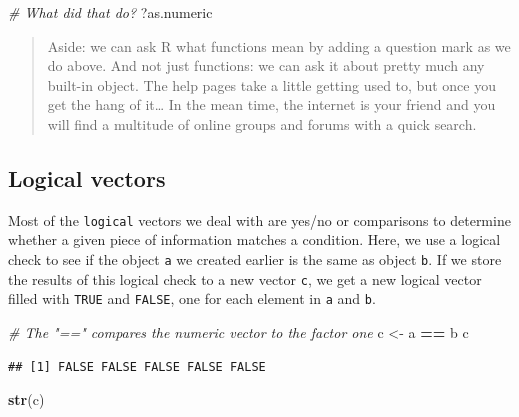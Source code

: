 \documentclass[
]{book}
\newenvironment{Shaded}{\begin{snugshade}}{\end{snugshade}}
\newcommand{\CommentTok}[1]{\textcolor[rgb]{0.56,0.35,0.01}{\textit{#1}}}
\newcommand{\KeywordTok}[1]{\textcolor[rgb]{0.13,0.29,0.53}{\textbf{#1}}}
\newcommand{\NormalTok}[1]{#1}
\newcommand{\OperatorTok}[1]{\textcolor[rgb]{0.81,0.36,0.00}{\textbf{#1}}}
\newcommand{\StringTok}[1]{\textcolor[rgb]{0.31,0.60,0.02}{#1}}
\begin{document}
\begin{Shaded}
\begin{Highlighting}[]
\CommentTok{# What did that do?}
\NormalTok{?as.numeric}
\end{Highlighting}
\end{Shaded}

\begin{quote}
Aside: we can ask R what functions mean by adding a question mark as we do above. And not just functions: we can ask it about pretty much any built-in object. The help pages take a little getting used to, but once you get the hang of it\ldots{} In the mean time, the internet is your friend and you will find a multitude of online groups and forums with a quick search.
\end{quote}

\hypertarget{logicals}{%
\subsection*{Logical vectors}\label{logicals}}

Most of the \texttt{logical} vectors we deal with are yes/no or comparisons to determine whether a given piece of information matches a condition. Here, we use a logical check to see if the object \texttt{a} we created earlier is the same as object \texttt{b}. If we store the results of this logical check to a new vector \texttt{c}, we get a new logical vector filled with \texttt{TRUE} and \texttt{FALSE}, one for each element in \texttt{a} and \texttt{b}.

\begin{Shaded}
\begin{Highlighting}[]
\CommentTok{# The "==" compares the numeric vector to the factor one}
\NormalTok{c <-}\StringTok{ }\NormalTok{a }\OperatorTok{==}\StringTok{ }\NormalTok{b}
\NormalTok{c}
\end{Highlighting}
\end{Shaded}

\begin{verbatim}
## [1] FALSE FALSE FALSE FALSE FALSE
\end{verbatim}

\begin{Shaded}
\begin{Highlighting}[]
\KeywordTok{str}\NormalTok{(c)}
\end{Highlighting}
\end{Shaded}
\end{document}
